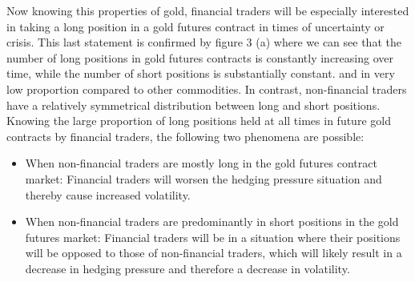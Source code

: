 \documentclass[12pt]{article}
\begin{document}

Now knowing this properties of gold, financial traders will be especially interested in taking a long position in a gold futures contract in times of uncertainty or crisis. This last statement is confirmed by figure 3 (a) where we can see that the number of long positions in gold futures contracts is constantly increasing over time, while the number of short positions is substantially constant. and in very low proportion compared to other commodities. In contrast, non-financial traders have a relatively symmetrical distribution between long and short positions. Knowing the large proportion of long positions held at all times in future gold contracts by financial traders, the following two phenomena are possible:
\begin{itemize}
\item When non-financial traders are mostly long in the gold futures contract market: Financial traders will worsen the hedging pressure situation and thereby cause increased volatility.
\item When non-financial traders are predominantly in short positions in the gold futures market: Financial traders will be in a situation where their positions will be opposed to those of non-financial traders, which will likely result in a decrease in hedging pressure and therefore a decrease in volatility.
\end{itemize}
\end{document}
